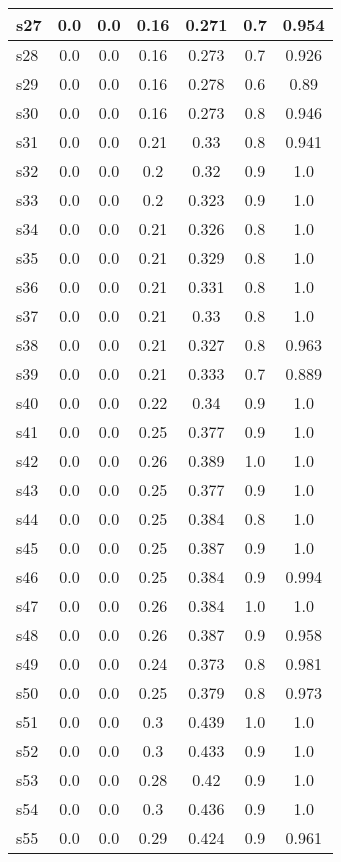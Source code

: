 \documentclass{article}
\begin{document}
\begin{tabular}{|l|c|c|c|c|c|c|}
\hline
s27 &0.0 & 0.0 & 0.16 & 0.271 & 0.7 & 0.954\\
\hline
s28 &0.0 & 0.0 & 0.16 & 0.273 & 0.7 & 0.926\\
\hline
s29 &0.0 & 0.0 & 0.16 & 0.278 & 0.6 & 0.89\\
\hline
s30 &0.0 & 0.0 & 0.16 & 0.273 & 0.8 & 0.946\\
\hline
s31 &0.0 & 0.0 & 0.21 & 0.33 & 0.8 & 0.941\\
\hline
s32 &0.0 & 0.0 & 0.2 & 0.32 & 0.9 & 1.0\\
\hline
s33 &0.0 & 0.0 & 0.2 & 0.323 & 0.9 & 1.0\\
\hline
s34 &0.0 & 0.0 & 0.21 & 0.326 & 0.8 & 1.0\\
\hline
s35 &0.0 & 0.0 & 0.21 & 0.329 & 0.8 & 1.0\\
\hline
s36 &0.0 & 0.0 & 0.21 & 0.331 & 0.8 & 1.0\\
\hline
s37 &0.0 & 0.0 & 0.21 & 0.33 & 0.8 & 1.0\\
\hline
s38 &0.0 & 0.0 & 0.21 & 0.327 & 0.8 & 0.963\\
\hline
s39 &0.0 & 0.0 & 0.21 & 0.333 & 0.7 & 0.889\\
\hline
s40 &0.0 & 0.0 & 0.22 & 0.34 & 0.9 & 1.0\\
\hline
s41 &0.0 & 0.0 & 0.25 & 0.377 & 0.9 & 1.0\\
\hline
s42 &0.0 & 0.0 & 0.26 & 0.389 & 1.0 & 1.0\\
\hline
s43 &0.0 & 0.0 & 0.25 & 0.377 & 0.9 & 1.0\\
\hline
s44 &0.0 & 0.0 & 0.25 & 0.384 & 0.8 & 1.0\\
\hline
s45 &0.0 & 0.0 & 0.25 & 0.387 & 0.9 & 1.0\\
\hline
s46 &0.0 & 0.0 & 0.25 & 0.384 & 0.9 & 0.994\\
\hline
s47 &0.0 & 0.0 & 0.26 & 0.384 & 1.0 & 1.0\\
\hline
s48 &0.0 & 0.0 & 0.26 & 0.387 & 0.9 & 0.958\\
\hline
s49 &0.0 & 0.0 & 0.24 & 0.373 & 0.8 & 0.981\\
\hline
s50 &0.0 & 0.0 & 0.25 & 0.379 & 0.8 & 0.973\\
\hline
s51 &0.0 & 0.0 & 0.3 & 0.439 & 1.0 & 1.0\\
\hline
s52 &0.0 & 0.0 & 0.3 & 0.433 & 0.9 & 1.0\\
\hline
s53 &0.0 & 0.0 & 0.28 & 0.42 & 0.9 & 1.0\\
\hline
s54 &0.0 & 0.0 & 0.3 & 0.436 & 0.9 & 1.0\\
\hline
s55 &0.0 & 0.0 & 0.29 & 0.424 & 0.9 & 0.961\\

\end{tabular}
\end{document}

